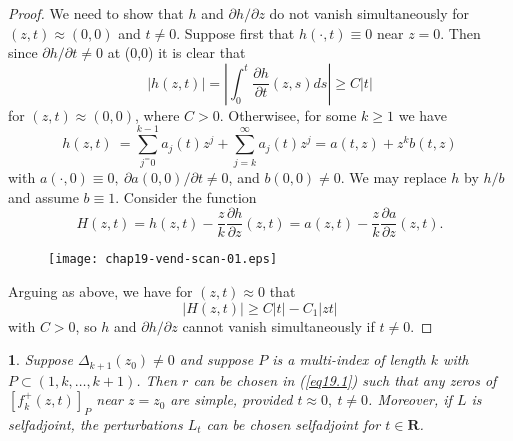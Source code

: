 \documentclass{surv-l}
\theoremstyle{plain}
\newtheorem{lemma}[theorem]{\sc{Lemma}}
\theoremstyle{definition}
\numberwithin{equation}{chapter}
\begin{document}
\begin{proof}
We need to show that $h$ and $\partial h/\partial z$ do not vanish simultaneously for $(z, t) \approx(0,0)$ and $t\neq 0$. Suppose first that $h(\cdot, t)\equiv 0$ near $z=0$. Then since $\partial h/\partial t\neq 0$ at (0,0) it is clear that
\begin{equation*}
|h(z, t)|=\left|\int_{0}^{t}\frac{\partial h}{\partial t}(z, s)ds\right|\geq C|t|
\end{equation*}
for $(z,t)\approx(0,0)$, where $C>0$. Otherwisee, for some $k\geq 1$ we have
\begin{equation*}
h(z, t)\ =\sum_{j^=0}^{k-1}a_{j}(t)z^{j}+\sum_{j=k}^{\infty}a_{j}(t)z^{j}=a(t, z)+z^{k}b(t, z)
\end{equation*}
with $a(\cdot, 0)\equiv 0,\ \partial a(0, 0)/\partial t\neq 0$, and $b(0,0)\neq 0$. We may replace $h$ by $h/b$ and assume $b\equiv 1$. Consider the function
\begin{equation*}
H(z,t)=h(z,t)-\frac{z}{k}\frac{\partial h}{\partial z}(z,t)=a(z, t)-\frac{z}{k}\frac{\partial a}{\partial z}(z, t).
\end{equation*}
\begin{figure}
\texttt{[image: chap19-vend-scan-01.eps]}
\caption{}\label{fig01}
\end{figure}
Arguing as above, we have for $(z,t)\approx 0$ that
\begin{equation*}
|H(z, t)|\geq C|t|-C_{1}|zt|
\end{equation*}
with $C>0$, so $h$ and $\partial h/\partial z$ cannot vanish simultaneously if $t\neq 0.$
\end{proof}
\setcounter{theorem}{11}
\begin{lemma}\label{lem19.12} Suppose $\Delta_{k+1}(z_{0})\neq 0$ and
suppose $P$ is a multi-index of length $k$ with $P\subset(1,k,\ldots,k+1)$. Then $r$ can be chosen in \emph{(\ref{eq19.1})} such that any zeros of $[f_{k}^{+} (z, t)]_{P}$ near $z = z_{0}$ are simple, provided $t\approx 0,\ t\neq 0$. Moreover, if $L$ is selfadjoint, the perturbations $L_{t}$ can be chosen selfadjoint for $t\in \mathbf{R}$.
\end{lemma}
\end{document}
